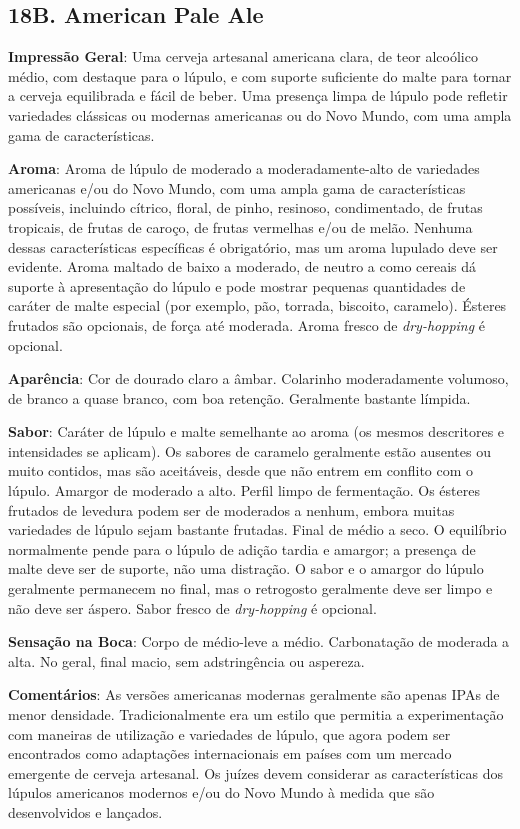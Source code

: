 \subsection*{18B. American Pale Ale}
\textbf{Impressão Geral}: Uma cerveja artesanal americana clara, de teor alcoólico médio, com destaque para o lúpulo, e com suporte suficiente do malte para tornar a cerveja equilibrada e fácil de beber. Uma presença limpa de lúpulo pode refletir variedades clássicas ou modernas americanas ou do Novo Mundo, com uma ampla gama de características.

\textbf{Aroma}: Aroma de lúpulo de moderado a moderadamente-alto de variedades americanas e/ou do Novo Mundo, com uma ampla gama de características possíveis, incluindo cítrico, floral, de pinho, resinoso, condimentado, de frutas tropicais, de frutas de caroço, de frutas vermelhas e/ou de melão. Nenhuma dessas características específicas é obrigatório, mas um aroma lupulado deve ser evidente. Aroma maltado de baixo a moderado, de neutro a como cereais dá suporte à apresentação do lúpulo e pode mostrar pequenas quantidades de caráter de malte especial (por exemplo, pão, torrada, biscoito, caramelo). Ésteres frutados são opcionais, de força até moderada. Aroma fresco de \textit{dry-hopping} é opcional.

\textbf{Aparência}: Cor de dourado claro a âmbar. Colarinho moderadamente volumoso, de branco a quase branco, com boa retenção. Geralmente bastante límpida.

\textbf{Sabor}: Caráter de lúpulo e malte semelhante ao aroma (os mesmos descritores e intensidades se aplicam). Os sabores de caramelo geralmente estão ausentes ou muito contidos, mas são aceitáveis, desde que não entrem em conflito com o lúpulo. Amargor de moderado a alto. Perfil limpo de fermentação. Os ésteres frutados de levedura podem ser de moderados a nenhum, embora muitas variedades de lúpulo sejam bastante frutadas. Final de médio a seco. O equilíbrio normalmente pende para o lúpulo de adição tardia e amargor; a presença de malte deve ser de suporte, não uma distração. O sabor e o amargor do lúpulo geralmente permanecem no final, mas o retrogosto geralmente deve ser limpo e não deve ser áspero. Sabor fresco de \textit{dry-hopping} é opcional.

\textbf{Sensação na Boca}: Corpo de médio-leve a médio. Carbonatação de moderada a alta. No geral, final macio, sem adstringência ou aspereza.

\textbf{Comentários}: As versões americanas modernas geralmente são apenas IPAs de menor densidade. Tradicionalmente era um estilo que permitia a experimentação com maneiras de utilização e variedades de lúpulo, que agora podem ser encontrados como adaptações internacionais em países com um mercado emergente de cerveja artesanal. Os juízes devem considerar as características dos lúpulos americanos modernos e/ou do Novo Mundo à medida que são desenvolvidos e lançados.

